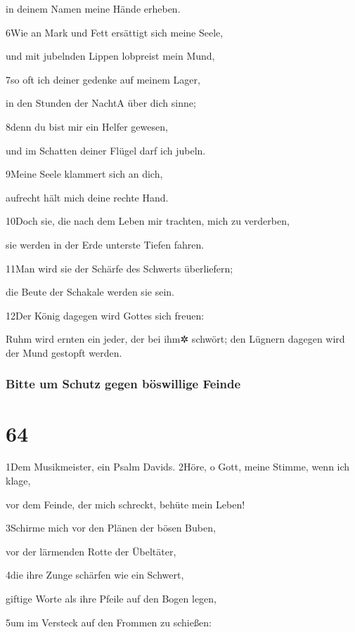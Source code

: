 in deinem Namen meine Hände erheben.

6Wie an Mark und Fett ersättigt sich meine Seele,

und mit jubelnden Lippen lobpreist mein Mund,

7so oft ich deiner gedenke auf meinem Lager,

in den Stunden der Nacht{A} über dich sinne;

8denn du bist mir ein Helfer gewesen,

und im Schatten deiner Flügel darf ich jubeln.

9Meine Seele klammert sich an dich,

aufrecht hält mich deine rechte Hand.

10Doch sie, die nach dem Leben mir trachten, mich zu verderben,

sie werden in der Erde unterste Tiefen fahren.

11Man wird sie der Schärfe des Schwerts überliefern;

die Beute der Schakale werden sie sein.

12Der König dagegen wird Gottes sich freuen:

Ruhm wird ernten ein jeder, der bei ihm✲ schwört; den Lügnern dagegen
wird der Mund gestopft werden.

\hypertarget{bitte-um-schutz-gegen-buxf6swillige-feinde}{%
\subsubsection{Bitte um Schutz gegen böswillige
Feinde}\label{bitte-um-schutz-gegen-buxf6swillige-feinde}}

\hypertarget{section-63}{%
\section{64}\label{section-63}}

1Dem Musikmeister, ein Psalm Davids. 2Höre, o Gott, meine Stimme, wenn
ich klage,

vor dem Feinde, der mich schreckt, behüte mein Leben!

3Schirme mich vor den Plänen der bösen Buben,

vor der lärmenden Rotte der Übeltäter,

4die ihre Zunge schärfen wie ein Schwert,

giftige Worte als ihre Pfeile auf den Bogen legen,

5um im Versteck auf den Frommen zu schießen:

